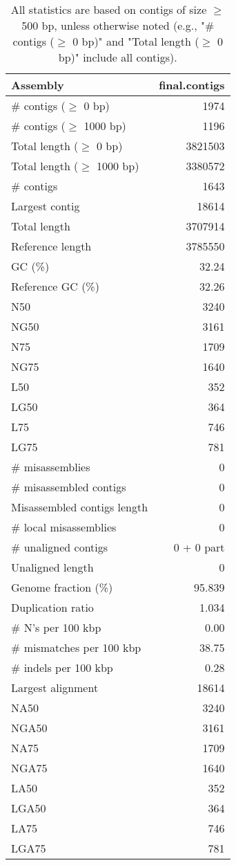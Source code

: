 \documentclass[12pt,a4paper]{article}
\begin{document}
\begin{table}[ht]
\begin{center}
\caption{All statistics are based on contigs of size $\geq$ 500 bp, unless otherwise noted (e.g., "\# contigs ($\geq$ 0 bp)" and "Total length ($\geq$ 0 bp)" include all contigs).}
\begin{tabular}{|l*{1}{|r}|}
\hline
Assembly & final.contigs \\ \hline
\# contigs ($\geq$ 0 bp) & 1974 \\ \hline
\# contigs ($\geq$ 1000 bp) & 1196 \\ \hline
Total length ($\geq$ 0 bp) & 3821503 \\ \hline
Total length ($\geq$ 1000 bp) & 3380572 \\ \hline
\# contigs & 1643 \\ \hline
Largest contig & 18614 \\ \hline
Total length & 3707914 \\ \hline
Reference length & 3785550 \\ \hline
GC (\%) & 32.24 \\ \hline
Reference GC (\%) & 32.26 \\ \hline
N50 & 3240 \\ \hline
NG50 & 3161 \\ \hline
N75 & 1709 \\ \hline
NG75 & 1640 \\ \hline
L50 & 352 \\ \hline
LG50 & 364 \\ \hline
L75 & 746 \\ \hline
LG75 & 781 \\ \hline
\# misassemblies & 0 \\ \hline
\# misassembled contigs & 0 \\ \hline
Misassembled contigs length & 0 \\ \hline
\# local misassemblies & 0 \\ \hline
\# unaligned contigs & 0 + 0 part \\ \hline
Unaligned length & 0 \\ \hline
Genome fraction (\%) & 95.839 \\ \hline
Duplication ratio & 1.034 \\ \hline
\# N's per 100 kbp & 0.00 \\ \hline
\# mismatches per 100 kbp & 38.75 \\ \hline
\# indels per 100 kbp & 0.28 \\ \hline
Largest alignment & 18614 \\ \hline
NA50 & 3240 \\ \hline
NGA50 & 3161 \\ \hline
NA75 & 1709 \\ \hline
NGA75 & 1640 \\ \hline
LA50 & 352 \\ \hline
LGA50 & 364 \\ \hline
LA75 & 746 \\ \hline
LGA75 & 781 \\ \hline
\end{tabular}
\end{center}
\end{table}
\end{document}
